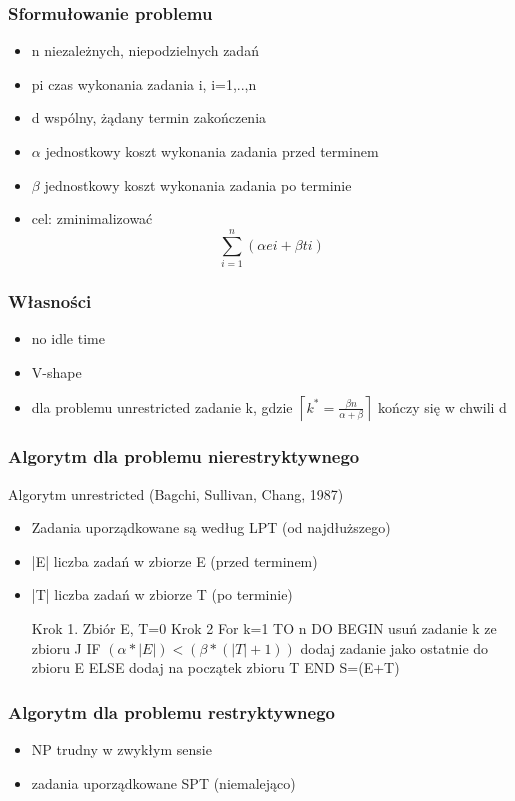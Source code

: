 \documentclass[12pt,a4paper]{article}
\begin{document}
\subsubsection{Sformułowanie problemu}
\begin{itemize}
\item n niezależnych, niepodzielnych zadań
\item pi czas wykonania zadania i, i=1,..,n
\item d wspólny, żądany termin zakończenia
\item $\alpha$ jednostkowy koszt wykonania zadania przed terminem
\item $\beta$ jednostkowy koszt wykonania zadania po terminie
\item cel: zminimalizować \begin{equation}
\sum\limits_{i=1}^{n}(\alpha ei+\beta ti)
\end{equation}
\end{itemize}
\subsubsection{Własności}
\begin{itemize}
\item no idle time
\item V-shape
\item dla problemu unrestricted zadanie k, gdzie $\left \lceil k^*=\frac{\beta n}{\alpha + \beta} \right \rceil$ kończy się w chwili d
\end{itemize}
\subsubsection{Algorytm dla problemu nierestryktywnego}
Algorytm unrestricted (Bagchi, Sullivan, Chang, 1987)
\begin{itemize}
	\item Zadania uporządkowane są według LPT (od najdłuższego)
	\item |E| liczba zadań w zbiorze E (przed terminem)
	\item |T| liczba zadań w zbiorze T (po terminie)
	
	Krok 1. Zbiór E, T=0
	Krok 2 For k=1 TO n DO
	BEGIN
	usuń zadanie k ze zbioru J
	IF $(\alpha * |E|)<(\beta *(|T|+1))$ dodaj zadanie jako ostatnie do zbioru E
	ELSE dodaj na początek zbioru T
	END
	S=(E+T)
\end{itemize}
\subsubsection{Algorytm dla problemu restryktywnego}
\begin{itemize}
	\item NP trudny w zwykłym sensie
	\item zadania uporządkowane SPT (niemalejąco)
\end{itemize}
\end{document}
